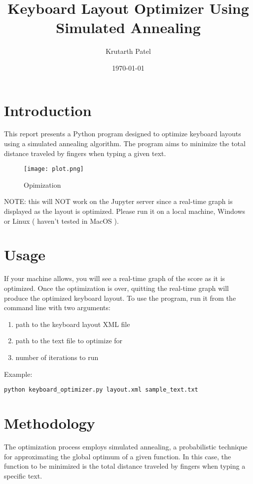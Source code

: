 \documentclass{article}
\title{Keyboard Layout Optimizer Using Simulated Annealing}
\author{Krutarth Patel}
\date{\today}
\begin{document}
\maketitle

\section{Introduction}
This report presents a Python program designed to optimize keyboard layouts using a simulated annealing algorithm. The program aims to minimize the total distance traveled by fingers when typing a given text.

\begin{figure}[htp]
	\centering
	\texttt{[image: plot.png]}
    \caption{Opimization}
\end{figure}

NOTE: this will NOT work on the Jupyter server since a real-time graph is displayed
as the layout is optimized. Please run it on a local machine, Windows or Linux ( haven't tested in MacOS ).

\section{Usage}
If your machine allows, you will see a real-time graph of the score
as it is optimized. Once the optimization is over, quitting the real-time graph will 
produce the optimized keyboard layout.
To use the program, run it from the command line with two arguments:
\begin{enumerate}
    \item path to the keyboard layout XML file
    \item path to the text file to optimize for
    \item number of iterations to run

\end{enumerate}

Example:
\begin{verbatim}
python keyboard_optimizer.py layout.xml sample_text.txt
\end{verbatim}
\section{Methodology}
The optimization process employs simulated annealing, a probabilistic technique for approximating the global optimum of a given function. In this case, the function to be minimized is the total distance traveled by fingers when typing a specific text.
\end{document}
